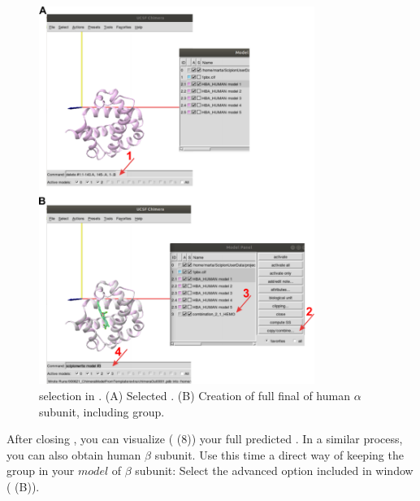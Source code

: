  \begin{figure}[H]
  \centering 
  \captionsetup{width=.7\linewidth} 
  \includegraphics[width=0.80\textwidth]{Images/Fig16}
  \caption{ selection in \chimera. (A) Selected  . (B) Creation of full final  of human  $\alpha$ subunit, including  group.}
  \label{fig:chimera_model}
  \end{figure}
 
 After closing \chimera, you can visualize ( (8)) your full predicted . In a similar process, you can also obtain human  $\beta$ subunit. %
 Use this time a direct way of keeping the  group in your $model$ of  $\beta$ subunit: Select the advanced option  included in   window ( (B)).\\
  
